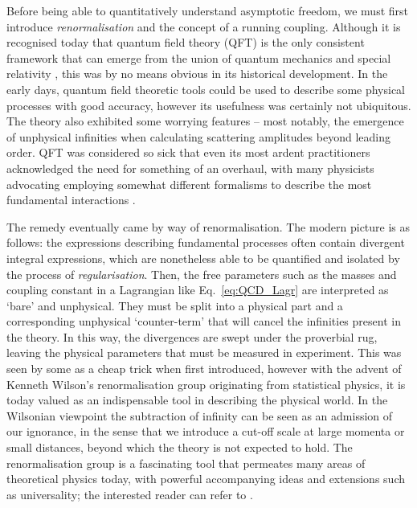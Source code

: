 \documentclass[11pt, a4paper, twoside]{book}
\begin{document}
Before being able to quantitatively understand asymptotic freedom, we must first introduce \emph{renormalisation} and the concept of a running coupling. Although it is recognised today that quantum field theory (QFT) is the only consistent framework that can emerge from the union of quantum mechanics and special relativity \cite{weinberg_1996}, this was by no means obvious in its historical development. In the early days, quantum field theoretic tools could be used to describe some physical processes with good accuracy, however its usefulness was certainly not ubiquitous. The theory also exhibited some worrying features -- most notably, the emergence of unphysical infinities when calculating scattering amplitudes beyond leading order. QFT was considered so sick that even its most ardent practitioners acknowledged the need for something of an overhaul, with many physicists advocating employing somewhat different formalisms to describe the most fundamental interactions \cite{Gross:1998jx}.

The remedy eventually came by way of renormalisation. The modern picture is as follows: the expressions describing fundamental processes often contain divergent integral expressions, which are nonetheless able to be quantified and isolated by the process of \emph{regularisation}. Then, the free parameters such as the masses and coupling constant in a Lagrangian like Eq.~\eqref{eq:QCD_Lagr} are interpreted as `bare' and unphysical. They must be split into a physical part and a corresponding unphysical `counter-term' that will cancel the infinities present in the theory. In this way, the divergences are swept under the proverbial rug, leaving the physical parameters that must be measured in experiment. This was seen by some as a cheap trick when first introduced, however with the advent of Kenneth Wilson's renormalisation group originating from statistical physics, it is today valued as an indispensable tool in describing the physical world. In the Wilsonian viewpoint the subtraction of infinity can be seen as an admission of our ignorance, in the sense that we introduce a cut-off scale at large momenta or small distances, beyond which the theory is not expected to hold. The renormalisation group is a fascinating tool that permeates many areas of theoretical physics today, with powerful accompanying ideas and extensions such as universality; the interested reader can refer to \cite{Kopietz:2010zz,Cardy:1996xt}.
\end{document}
